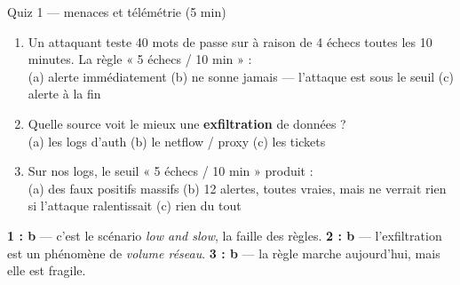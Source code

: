 \begin{frame}{Quiz 1 --- menaces et télémétrie (5 min)}
\begin{qbox}[3 questions]
\begin{enumerate}
\item Un attaquant teste 40 mots de passe sur  à raison de
4 échecs toutes les 10 minutes. La règle « 5 échecs / 10 min » :\\
(a) alerte immédiatement \quad (b) ne sonne jamais --- l'attaque est sous le seuil \quad
(c) alerte à la fin
\item Quelle source voit le mieux une \textbf{exfiltration} de données ?\\
(a) les logs d'auth \quad (b) le netflow / proxy \quad (c) les tickets
\item Sur nos logs, le seuil « 5 échecs / 10 min » produit :\\
(a) des faux positifs massifs \quad (b) 12 alertes, toutes vraies, mais ne
verrait rien si l'attaque ralentissait \quad (c) rien du tout
\end{enumerate}
\end{qbox}
\vspace{1mm}
\begin{solbox}[Réponses]
\textbf{1 : b} --- c'est le scénario \emph{low and slow}, la faille des règles.
\quad
\textbf{2 : b} --- l'exfiltration est un phénomène de \emph{volume réseau}.
\quad
\textbf{3 : b} --- la règle marche aujourd'hui, mais elle est fragile.
\end{solbox}
\end{frame}

